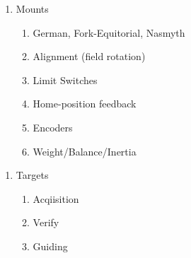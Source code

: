 \documentclass[letter,11pt,oneside]{article}
\begin{document}
\vspace{-.15cm}
\begin{enumerate}\addtolength{\itemsep}{-0.5\baselineskip}
\setcounter{enumi}{3}
   \item   Mounts
\vspace{-.15cm}
\begin{enumerate}\addtolength{\itemsep}{-0.5\baselineskip}
   \item   German, Fork-Equitorial, Nasmyth
   \item   Alignment (field rotation)
   \item   Limit Switches
   \item   Home-position feedback
   \item   Encoders
   \item   Weight/Balance/Inertia
\end{enumerate}
\end{enumerate}


\vspace{-.15cm}
\begin{enumerate}\addtolength{\itemsep}{-0.5\baselineskip}
\setcounter{enumi}{4}
   \item   Targets
\vspace{-.15cm}
\begin{enumerate}\addtolength{\itemsep}{-0.5\baselineskip}
   \item   Acqiisition
   \item   Verify
   \item   Guiding
\end{enumerate}
\end{enumerate}
\end{document}
